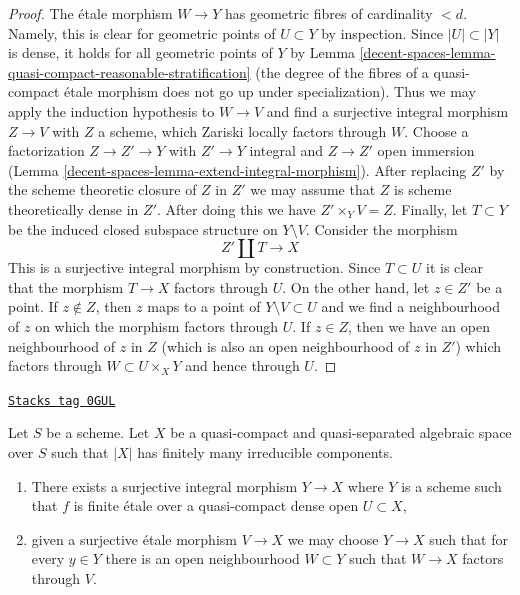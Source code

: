 \begin{proof}
\medskip\noindent
The \'etale morphism $W \to Y$ has geometric fibres of cardinality $< d$.
Namely, this is clear for geometric points of $U \subset Y$ by inspection.
Since $|U| \subset |Y|$ is dense, it holds for all geometric points of $Y$
by Lemma \ref{decent-spaces-lemma-quasi-compact-reasonable-stratification}
(the degree of the fibres of a quasi-compact \'etale morphism
does not go up under specialization). Thus we may apply the induction
hypothesis to $W \to V$ and find a surjective integral morphism
$Z \to V$ with $Z$ a scheme, which Zariski locally factors through $W$.
Choose a factorization $Z \to Z' \to Y$ with $Z' \to Y$ integral and
$Z \to Z'$ open immersion
(Lemma \ref{decent-spaces-lemma-extend-integral-morphism}).
After replacing $Z'$ by the scheme theoretic closure of $Z$ in $Z'$
we may assume that $Z$ is scheme theoretically dense in $Z'$.
After doing this we have $Z' \times_Y V = Z$. Finally,
let $T \subset Y$ be the induced closed subspace structure on $Y \setminus V$.
Consider the morphism
$$
Z' \amalg T \longrightarrow X
$$
This is a surjective integral morphism by construction.
Since $T \subset U$ it is clear that the morphism $T \to X$
factors through $U$. On the other hand, let $z \in Z'$
be a point. If $z \not \in Z$, then $z$ maps to a point of
$Y \setminus V \subset U$ and we find a neighbourhood of $z$
on which the morphism factors through $U$.
If $z \in Z$, then we have an open neighbourhood of $z$ in $Z$
(which is also an open neighbourhood of $z$ in $Z'$)
which factors through $W \subset U \times_X Y$ and hence through $U$.
\end{proof}

\begin{lemma}
\label{decent-spaces-lemma-there-is-a-scheme-integral-over-refined}
\href{https://stacks.math.columbia.edu/tag/0GUL}{\texttt{Stacks tag 0GUL}}

Let $S$ be a scheme. Let $X$ be a quasi-compact and quasi-separated
algebraic space over $S$ such that $|X|$ has finitely many irreducible
components.
\begin{enumerate}
\item There exists a surjective integral morphism $Y \to X$ where $Y$
is a scheme such that $f$ is finite \'etale over a quasi-compact
dense open $U \subset X$,
\item given a surjective \'etale morphism $V \to X$ we may choose
$Y \to X$ such that for every $y \in Y$ there is an open neighbourhood
$W \subset Y$ such that $W \to X$ factors through $V$.
\end{enumerate}
\end{lemma}

